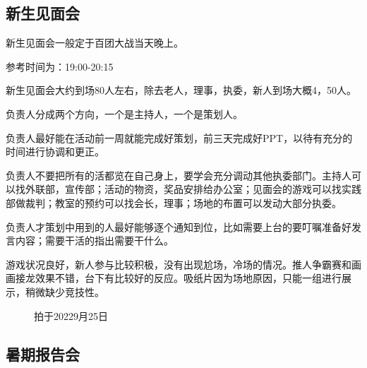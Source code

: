 \documentclass{ctexbook}
\begin{document}
\subsection{新生见面会}
新生见面会一般定于百团大战当天晚上。

参考时间为：19:00-20:15

新生见面会大约到场80人左右，除去老人，理事，执委，新人到场大概4，50人。

负责人分成两个方向，一个是主持人，一个是策划人。

负责人最好能在活动前一周就能完成好策划，前三天完成好PPT，以待有充分的时间进行协调和更正。

负责人不要把所有的活都览在自己身上，要学会充分调动其他执委部门。主持人可以找外联部，宣传部；活动的物资，奖品安排给办公室；见面会的游戏可以找实践部做裁判；教室的预约可以找会长，理事；场地的布置可以发动大部分执委。

负责人才策划中用到的人最好能够逐个通知到位，比如需要上台的要叮嘱准备好发言内容；需要干活的指出需要干什么。

游戏状况良好，新人参与比较积极，没有出现尬场，冷场的情况。推人争霸赛和画画接龙效果不错，台下有比较好的反应。吸纸片因为场地原因，只能一组进行展示，稍微缺少竞技性。





\begin{figure}[!htb]
    \centering
       \quad 
        \caption{拍于20229月25日}
  \end{figure}


\subsection{暑期报告会}
\end{document}
